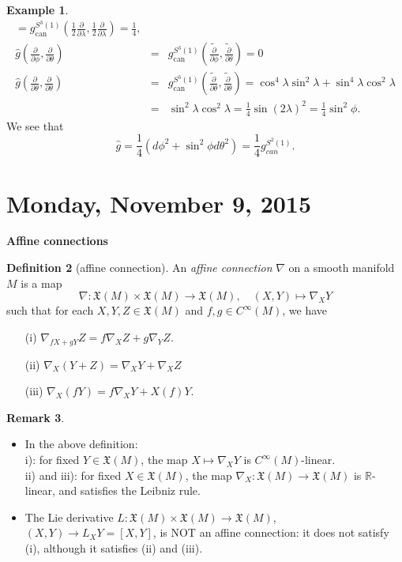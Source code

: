 \documentclass{amsart}
\numberwithin{equation}{section}
\newcommand{\bR}{\mathbb{R}}
\newcommand{\fX}{\mathfrak{X}}
\theoremstyle{definition}
\newtheorem{definition}{Definition} [section]
\newtheorem{example}[definition]{Example}
\newtheorem{remark}[definition]{Remark}
\theoremstyle{theorem}
\begin{document}
\begin{example}
\begin{eqnarray*}
= g^{S^3(1)}_\mathrm{can} (\frac{1}{2} \frac{\partial}{\partial \lambda}, \frac{1}{2} \frac{\partial}{\partial \lambda}) 
= \frac{1}{4},\\
\hat{g}(\frac{\partial}{\partial \phi}, \frac{\partial}{\partial \theta}) &=&
g_\mathrm{can}^{S^3(1)} (\widetilde{\frac{\partial}{\partial \phi}}, \widetilde{\frac{\partial}{\partial \theta}}) 
=0\\
\hat{g}(\frac{\partial}{\partial \theta}, \frac{\partial}{\partial \theta}) &=&
g_\mathrm{can}^{S^3(1)} (\widetilde{\frac{\partial}{\partial \theta}}, \widetilde{\frac{\partial}{\partial \theta}}) =\cos^4\lambda \sin^2\lambda +\sin^4\lambda \cos^2\lambda\\
&=&
\sin^2\lambda \cos^2\lambda = \frac{1}{4}\sin(2\lambda)^2 = \frac{1}{4} \sin^2 \phi.
\end{eqnarray*}
We see that 
\[
\hat{g} = \frac{1}{4}(d \phi^2 + \sin^2\phi d\theta^2) = \frac{1}{4}g_{can}^{S^2(1)}. 
\]
\end{example}




\section{Monday, November 9, 2015}

\noindent
{\bf \large Affine connections}

\begin{definition}[affine connection]
An {\em affine connection} $\nabla$ on a smooth manifold $M$ is a map 
$$
\nabla : \mathfrak{X}(M) \times \mathfrak{X}(M) \to \mathfrak{X}(M),\quad
(X,Y) \mapsto \nabla_XY
$$
such that for each $X,Y, Z \in \mathfrak{X}(M)$ and $f,g \in C^\infty(M)$, we have 
\begin{enumerate}
\item[(i)] $\nabla_{fX + gY}Z = f \nabla_XZ + g\nabla_YZ$. \\

\item[(ii)] $\nabla_X(Y + Z) = \nabla_XY + \nabla_XZ$
\item[(iii)] $\nabla_X(fY) = f\nabla_XY + X(f)Y$.\\

\end{enumerate}
\end{definition}

\begin{remark} 
\begin{itemize}
\item In the above definition:\\
i): for fixed $Y\in  \mathfrak{X}(M)$, the map $X\mapsto \nabla_X Y$  is $C^\infty(M)$-linear.\\
ii) and iii): for fixed $X\in \mathfrak{X}(M)$, the map
$\nabla_X: \fX(M)\to \fX(M)$ is $\bR$-linear, and satisfies the Leibniz rule.
\item The Lie derivative $L : \fX(M) \times \fX(M) \to \fX(M)$, $(X,Y)\to L_X Y=[X,Y]$, is
NOT an affine connection: it does not satisfy (i), although it satisfies (ii) and (iii). 
\end{itemize}
\end{remark}
\end{document}
